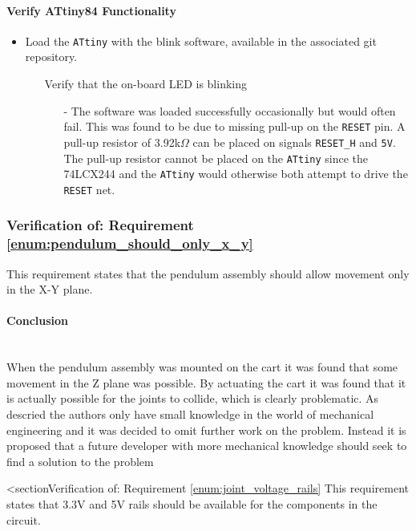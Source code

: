 \paragraph{Verify ATtiny84 Functionality} %
\label{par:verify_attiny84_functionality}
\begin{itemize}
	\item Load the \texttt{ATtiny} with the blink software, available in the associated git repository.
	\begin{itemize}
		\item[\xmark] Verify that the on-board LED is blinking
		\begin{itemize}
			\item[-] The software was loaded successfully occasionally but would often fail.
			This was found to be due to missing pull-up on the \texttt{RESET} pin.
			A pull-up resistor of 3.92k$\Omega$ can be placed on signals \texttt{RESET\_H} and \texttt{5V}.
			The pull-up resistor cannot be placed on the \texttt{ATtiny} since the 74LCX244 and the \texttt{ATtiny} would otherwise both attempt to drive the \texttt{RESET} net.
		\end{itemize}
	\end{itemize}
\end{itemize}

\subsubsection{Verification of: Requirement \ref{enum:pendulum_should_only_x_y}} %
\label{ssub:verification_of_requirement_enum:pendulum_should_only_x_y}
This requirement states that the pendulum assembly should allow movement only in the X-Y plane. 

\paragraph{Conclusion}~\\
When the pendulum assembly was mounted on the cart it was found that some movement in the Z plane was possible.
By actuating the cart it was found that it is actually possible for the joints to collide, which is clearly problematic.
As descried the authors only have small knowledge in the world of mechanical engineering and it was decided to omit further work on the problem.
Instead it is proposed that a future developer with more mechanical knowledge should seek to find a solution to the problem 

\subsub<section{Verification of: Requirement \ref{enum:joint_voltage_rails}} %
\label{sub:verification_of_requirement_enum:joint_voltage_rails}
This requirement states that 3.3V and 5V rails should be available for the components in the circuit.

